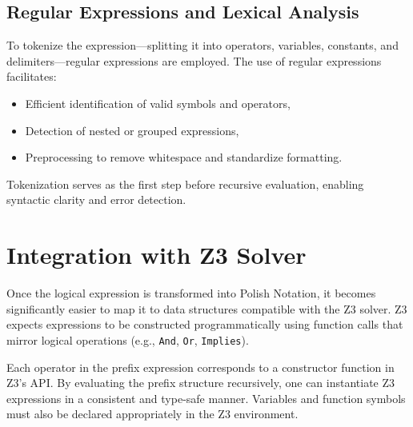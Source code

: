 \documentclass[11pt]{article}
\begin{document}
\subsection{Regular Expressions and Lexical Analysis}
To tokenize the expression—splitting it into operators, variables, constants, and delimiters—regular expressions are employed. The use of regular expressions facilitates:
\begin{itemize}
    \item Efficient identification of valid symbols and operators,
    \item Detection of nested or grouped expressions,
    \item Preprocessing to remove whitespace and standardize formatting.
\end{itemize}

Tokenization serves as the first step before recursive evaluation, enabling syntactic clarity and error detection.

\section{Integration with Z3 Solver}
Once the logical expression is transformed into Polish Notation, it becomes significantly easier to map it to data structures compatible with the Z3 solver. Z3 expects expressions to be constructed programmatically using function calls that mirror logical operations (e.g., \texttt{And}, \texttt{Or}, \texttt{Implies}).

Each operator in the prefix expression corresponds to a constructor function in Z3’s API. By evaluating the prefix structure recursively, one can instantiate Z3 expressions in a consistent and type-safe manner. Variables and function symbols must also be declared appropriately in the Z3 environment.
\end{document}

